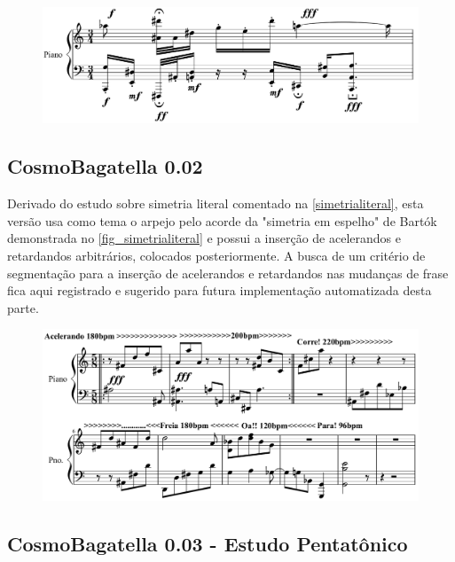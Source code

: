 \documentclass[
	12pt,				%
	openright,			%
	twoside,			%
	a4paper,			%
	english,			%
	french,				%
	spanish,			%
	brazil				%
	]{abntex2}
\begin{document}
\begin{figure}[!h]
	\begin{center}
	    \includegraphics*[scale=0.4]{score/CosmoBagatella001.png}
	\end{center}
\end{figure}


\subsection{CosmoBagatella 0.02}

Derivado do estudo sobre simetria literal comentado na \autoref{simetrialiteral}, esta versão usa como tema o arpejo pelo acorde da "simetria em espelho" de Bartók demonstrada no \autoref{fig_simetrialiteral} e possui a inserção de acelerandos e retardandos arbitrários, colocados posteriormente. A busca de um critério de segmentação para a inserção de acelerandos e retardandos nas mudanças de frase fica aqui registrado e sugerido para futura implementação automatizada desta parte.


\begin{figure}[!h]
	\begin{center}
	    \includegraphics*[scale=0.4]{score/CosmoBagatella002.png}
	\end{center}
\end{figure}

\subsection{CosmoBagatella 0.03 - Estudo Pentatônico}
\end{document}

